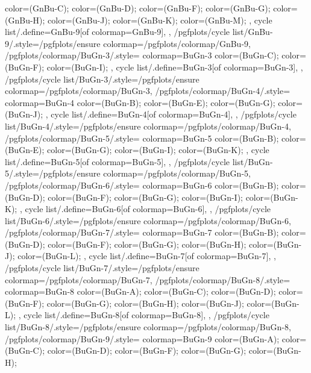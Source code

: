 {{{      color=(GnBu-C);
      color=(GnBu-D);
      color=(GnBu-F);
      color=(GnBu-G);
      color=(GnBu-H);
      color=(GnBu-J);
      color=(GnBu-K);
      color=(GnBu-M);
    },
    cycle list/.define={GnBu-9}{[of colormap=GnBu-9]},
  },
  /pgfplots/cycle list/GnBu-9/.style={/pgfplots/ensure colormap={/pgfplots/colormap/GnBu-9}},
  /pgfplots/colormap/BuGn-3/.style={
    colormap={BuGn-3}{
      color=(BuGn-C);
      color=(BuGn-F);
      color=(BuGn-I);
    },
    cycle list/.define={BuGn-3}{[of colormap=BuGn-3]},
  },
  /pgfplots/cycle list/BuGn-3/.style={/pgfplots/ensure colormap={/pgfplots/colormap/BuGn-3}},
  /pgfplots/colormap/BuGn-4/.style={
    colormap={BuGn-4}{
      color=(BuGn-B);
      color=(BuGn-E);
      color=(BuGn-G);
      color=(BuGn-J);
    },
    cycle list/.define={BuGn-4}{[of colormap=BuGn-4]},
  },
  /pgfplots/cycle list/BuGn-4/.style={/pgfplots/ensure colormap={/pgfplots/colormap/BuGn-4}},
  /pgfplots/colormap/BuGn-5/.style={
    colormap={BuGn-5}{
      color=(BuGn-B);
      color=(BuGn-E);
      color=(BuGn-G);
      color=(BuGn-I);
      color=(BuGn-K);
    },
    cycle list/.define={BuGn-5}{[of colormap=BuGn-5]},
  },
  /pgfplots/cycle list/BuGn-5/.style={/pgfplots/ensure colormap={/pgfplots/colormap/BuGn-5}},
  /pgfplots/colormap/BuGn-6/.style={
    colormap={BuGn-6}{
      color=(BuGn-B);
      color=(BuGn-D);
      color=(BuGn-F);
      color=(BuGn-G);
      color=(BuGn-I);
      color=(BuGn-K);
    },
    cycle list/.define={BuGn-6}{[of colormap=BuGn-6]},
  },
  /pgfplots/cycle list/BuGn-6/.style={/pgfplots/ensure colormap={/pgfplots/colormap/BuGn-6}},
  /pgfplots/colormap/BuGn-7/.style={
    colormap={BuGn-7}{
      color=(BuGn-B);
      color=(BuGn-D);
      color=(BuGn-F);
      color=(BuGn-G);
      color=(BuGn-H);
      color=(BuGn-J);
      color=(BuGn-L);
    },
    cycle list/.define={BuGn-7}{[of colormap=BuGn-7]},
  },
  /pgfplots/cycle list/BuGn-7/.style={/pgfplots/ensure colormap={/pgfplots/colormap/BuGn-7}},
  /pgfplots/colormap/BuGn-8/.style={
    colormap={BuGn-8}{
      color=(BuGn-A);
      color=(BuGn-C);
      color=(BuGn-D);
      color=(BuGn-F);
      color=(BuGn-G);
      color=(BuGn-H);
      color=(BuGn-J);
      color=(BuGn-L);
    },
    cycle list/.define={BuGn-8}{[of colormap=BuGn-8]},
  },
  /pgfplots/cycle list/BuGn-8/.style={/pgfplots/ensure colormap={/pgfplots/colormap/BuGn-8}},
  /pgfplots/colormap/BuGn-9/.style={
    colormap={BuGn-9}{
      color=(BuGn-A);
      color=(BuGn-C);
      color=(BuGn-D);
      color=(BuGn-F);
      color=(BuGn-G);
      color=(BuGn-H);
}}}
